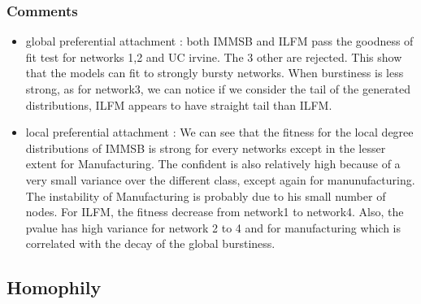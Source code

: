\documentclass[a4paper, 12pt]{article}
\begin{document}
\subsubsection{Comments}

\begin{itemize}
    \item global preferential attachment : both IMMSB and ILFM pass the goodness of fit test for networks 1,2 and UC irvine. The 3 other are rejected. This show that the models can fit to strongly bursty networks. When burstiness is less strong, as for network3, we can notice if we consider the tail of the generated distributions, ILFM appears to have straight tail than ILFM.
    \item local preferential attachment : We can see that the fitness for the local degree distributions of IMMSB is strong for every networks except in the lesser extent for Manufacturing. The confident is also relatively high because of a very small variance over the different class, except again for manunufacturing. The instability of Manufacturing is probably due to his small number of nodes. For ILFM, the fitness decrease from network1 to network4. Also, the pvalue has high variance for network 2 to 4 and for manufacturing which is correlated with the decay of the global burstiness.
\end{itemize}

\subsection{Homophily}


\end{document}
